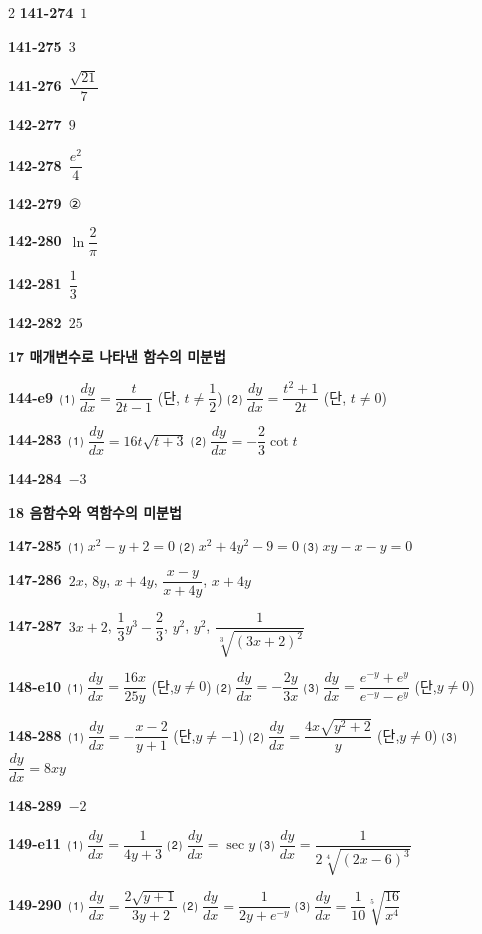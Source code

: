 \documentclass[10pt,a4paper]{article}
\newcommand{\cond}[1]{\mbox{(단,}\nobreakspace#1)}
\begin{document}
\begin{multicols}{2}
\noindent\textbf{141-274}\ $1$\par
\noindent\textbf{141-275}\ $3$\par
\noindent\textbf{141-276}\ $\dfrac{\sqrt{21}}{7}$\par
\noindent\textbf{142-277}\ $9$\par
\noindent\textbf{142-278}\ $\dfrac{e^2}{4}$\par
\noindent\textbf{142-279}\ ②\par
\noindent\textbf{142-280}\ $\ln\dfrac{2}{\pi}$\par
\noindent\textbf{142-281}\ $\dfrac{1}{3}$\par
\noindent\textbf{142-282}\ $25$\par
\noindent\textbf{17 매개변수로 나타낸 함수의 미분법}\par\smallskip
\noindent\textbf{144-e9}\ ⑴ $\dfrac{dy}{dx}=\dfrac{t}{2t-1}$ (단, $t\ne\dfrac{1}{2}$) ⑵ $\dfrac{dy}{dx}=\dfrac{t^2+1}{2t}$ (단, $t\ne 0$)\par
\noindent\textbf{144-283}\ ⑴ $\dfrac{dy}{dx}=16t\sqrt{t+3}$ ⑵ $\dfrac{dy}{dx}=-\dfrac{2}{3}\cot t$\par
\noindent\textbf{144-284}\ $-3$\par
\noindent\textbf{18 음함수와 역함수의 미분법}\par\smallskip
\noindent\textbf{147-285}\ ⑴ $x^2-y+2=0$ ⑵ $x^2+4y^2-9=0$ ⑶ $xy-x-y=0$\par
\noindent\textbf{147-286}\ $2x$, $8y$, $x+4y$, $\dfrac{x-y}{x+4y}$, $x+4y$\par
\noindent\textbf{147-287}\ $3x+2$, $\dfrac{1}{3}y^3-\dfrac{2}{3}$, $y^2$, $y^2$, $\dfrac{1}{\sqrt[3]{(3x+2)^2}}$\par
\noindent\textbf{148-e10}\ ⑴ $\dfrac{dy}{dx}=\dfrac{16x}{25y}$ \cond{$y\ne 0$} ⑵ $\dfrac{dy}{dx}=-\dfrac{2y}{3x}$ ⑶ $\dfrac{dy}{dx}=\dfrac{e^{-y}+e^{y}}{e^{-y}-e^{y}}$ \cond{$y\ne 0$}\par
\noindent\textbf{148-288}\ ⑴ $\dfrac{dy}{dx}=-\dfrac{x-2}{y+1}$ \cond{$y\ne -1$} ⑵ $\dfrac{dy}{dx}=\dfrac{4x\sqrt{y^2+2}}{y}$ \cond{$y\ne 0$} ⑶ $\dfrac{dy}{dx}=8xy$\par
\noindent\textbf{148-289}\ $-2$\par
\noindent\textbf{149-e11}\ ⑴ $\dfrac{dy}{dx}=\dfrac{1}{4y+3}$ ⑵ $\dfrac{dy}{dx}=\sec y$ ⑶ $\dfrac{dy}{dx}=\dfrac{1}{2\sqrt[4]{(2x-6)^3}}$\par
\noindent\textbf{149-290}\ ⑴ $\dfrac{dy}{dx}=\dfrac{2\sqrt{y+1}}{3y+2}$ ⑵ $\dfrac{dy}{dx}=\dfrac{1}{2y+e^{-y}}$ ⑶ $\dfrac{dy}{dx}=\dfrac{1}{10}\sqrt[5]{\dfrac{16}{x^4}}$\par

\end{multicols}
\end{document}
